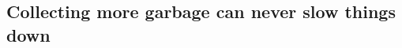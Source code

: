 \documentclass[9pt]{sigplanconf}
\begin{document}
\begin{enumerate}
\section{Collecting more garbage can never slow things down}
\label{sec:lgc-always-better}


 






\end{enumerate}
\end{document}
